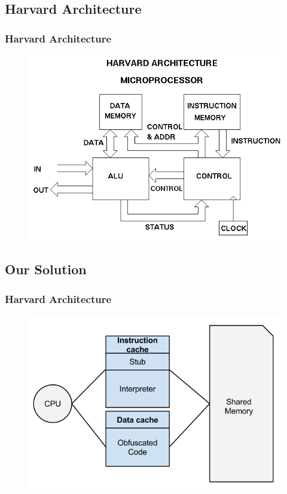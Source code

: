 \documentclass{beamer}
\begin{document}
\subsection{Harvard Architecture}
\begin{frame}
	\frametitle{Harvard Architecture}
		\begin{figure}
			\includegraphics[width=0.75\linewidth]{img/harvard.png}
		\end{figure}
\end{frame}


\subsection{Our Solution}
\begin{frame}
	\frametitle{Harvard Architecture}
		\begin{figure}
			\includegraphics[width=0.75\linewidth]{img/Harvard_implementation.png}
		\end{figure}
\end{frame}

\end{document}
